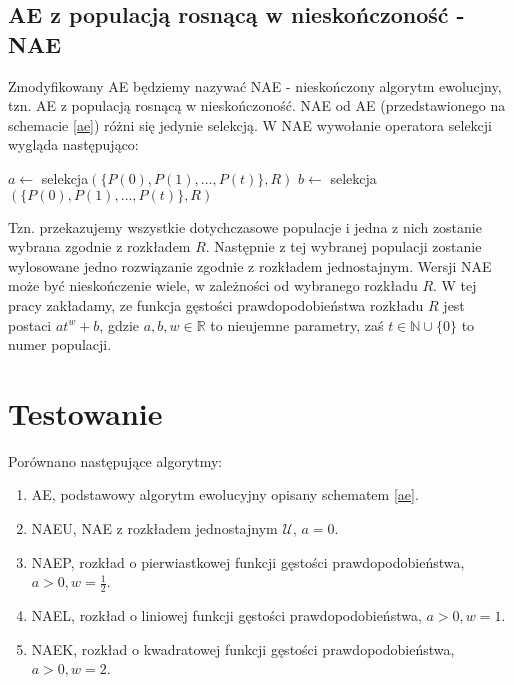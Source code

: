 \documentclass[12pt, a4paper]{article}
\begin{document}
\subsection{AE z populacją rosnącą w nieskończoność - NAE}

Zmodyfikowany AE będziemy nazywać NAE - nieskończony algorytm ewolucjny, tzn. AE z populacją rosnącą w nieskończoność.
NAE od AE (przedstawionego na schemacie \ref{ae}) różni się jedynie selekcją. W NAE wywołanie operatora selekcji wygląda następująco:

\begin{algorithm}[!htb]
\begin{algorithmic}[1] 
  \State $a \gets$ selekcja$(\{P(0), P(1), \dots, P(t)\}, R)$
  \State $b \gets$ selekcja$(\{P(0), P(1), \dots, P(t)\}, R)$
\end{algorithmic}
\end{algorithm}

Tzn. przekazujemy wszystkie dotychczasowe populacje i jedna z nich zostanie wybrana zgodnie z rozkładem $R$.
Następnie z tej wybranej populacji zostanie wylosowane jedno rozwiązanie zgodnie z rozkładem jednostajnym.
Wersji NAE może być nieskończenie wiele, w zależności od wybranego rozkładu $R$. 
W tej pracy zakładamy, ze funkcja gęstości prawdopodobieństwa rozkładu $R$ jest postaci $at^w + b$, gdzie
$a, b, w \in \mathbb{R}$ to nieujemne parametry, zaś $t \in \mathbb{N} \cup \{0\}$ to numer populacji. 

\section{Testowanie}

Porównano następujące algorytmy:

\begin{enumerate}
 \item AE, podstawowy algorytm ewolucyjny opisany schematem \ref{ae}.
 \item NAEU, NAE z rozkładem jednostajnym $\mathcal{U}$, $a=0$.
 \item NAEP, rozkład o pierwiastkowej funkcji gęstości prawdopodobieństwa, \\$a>0, w=\frac{1}{2}$.
 \item NAEL, rozkład o liniowej funkcji gęstości prawdopodobieństwa, $a>0, w=1$.
 \item NAEK, rozkład o kwadratowej funkcji gęstości prawdopodobieństwa, \\$a>0, w=2$.
\end{enumerate}
\end{document}
